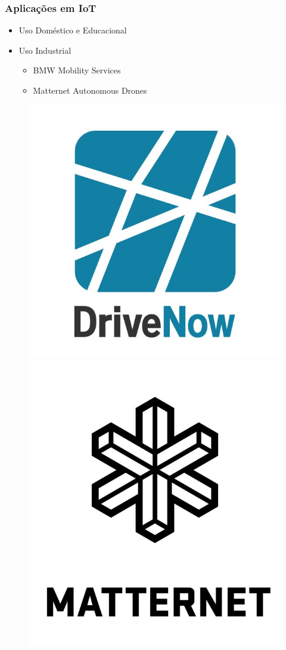 \documentclass[12pt]{beamer}
\begin{document}
\begin{frame}
    \frametitle{Aplicações em IoT}
    \begin{itemize}
        \item Uso Doméstico e Educacional
        \item Uso Industrial
            \begin{itemize}
                \item BMW Mobility Services
                \item Matternet Autonomous Drones
            \end{itemize}
    \end{itemize}
    \begin{figure}
        \centering
        \includegraphics[width=.4\textwidth]{drivenow_logo}
        \includegraphics[width=.4\textwidth]{matternet_logo}
    \end{figure}
\end{frame}
\end{document}
